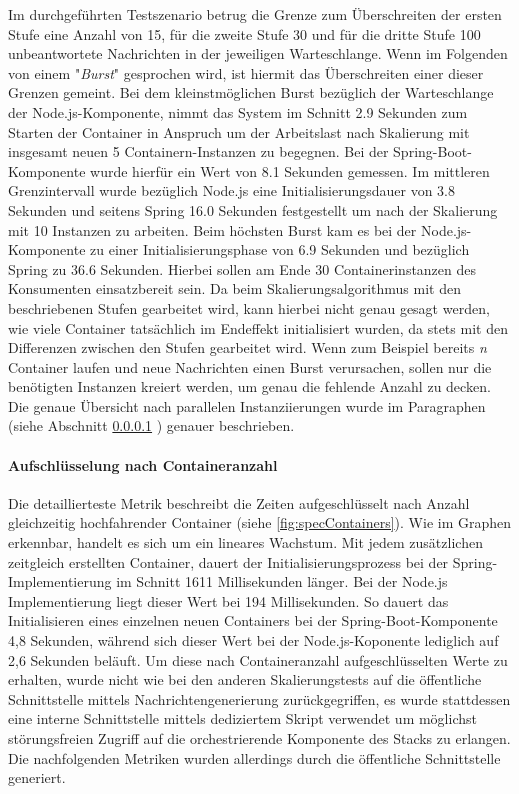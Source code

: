 Im durchgeführten Testszenario betrug die Grenze zum Überschreiten der ersten Stufe eine Anzahl von 15, für die zweite Stufe 30 und für die dritte Stufe 100 unbeantwortete Nachrichten in der jeweiligen Warteschlange. Wenn im Folgenden von einem "\emph{Burst}" gesprochen wird, ist hiermit das Überschreiten einer dieser Grenzen gemeint. Bei dem kleinstmöglichen Burst bezüglich der Warteschlange der Node.js-Komponente, nimmt das System im Schnitt 2.9 Sekunden zum Starten der Container in Anspruch um der Arbeitslast nach Skalierung mit insgesamt neuen 5 Containern-Instanzen zu begegnen. Bei der Spring-Boot-Komponente wurde hierfür ein Wert von 8.1 Sekunden gemessen. Im mittleren Grenzintervall wurde bezüglich Node.js eine Initialisierungsdauer von 3.8 Sekunden und seitens Spring 16.0 Sekunden festgestellt um nach der Skalierung mit 10 Instanzen zu arbeiten. Beim höchsten Burst kam es bei der Node.js-Komponente zu einer Initialisierungsphase von 6.9 Sekunden und bezüglich Spring zu 36.6 Sekunden. Hierbei sollen am Ende 30 Containerinstanzen des Konsumenten einsatzbereit sein. Da beim Skalierungsalgorithmus mit den beschriebenen Stufen gearbeitet wird, kann hierbei nicht genau gesagt werden, wie viele Container tatsächlich im Endeffekt initialisiert wurden, da stets mit den Differenzen zwischen den Stufen gearbeitet wird. Wenn zum Beispiel bereits \emph{n} Container laufen und neue Nachrichten einen Burst verursachen, sollen nur die benötigten Instanzen kreiert werden, um genau die fehlende Anzahl zu decken. Die genaue Übersicht nach parallelen Instanziierungen wurde im Paragraphen (siehe Abschnitt \ref{par:specContainer} ) genauer beschrieben.


\paragraph{Aufschlüsselung nach Containeranzahl}
\label{par:specContainer}
Die detaillierteste Metrik beschreibt die Zeiten aufgeschlüsselt nach Anzahl gleichzeitig hochfahrender Container (siehe \ref{fig:specContainers}). Wie im Graphen erkennbar, handelt es sich um ein lineares Wachstum. Mit jedem zusätzlichen zeitgleich erstellten Container, dauert der Initialisierungsprozess bei der Spring-Implementierung im Schnitt 1611 Millisekunden länger. Bei der Node.js Implementierung liegt dieser Wert bei 194 Millisekunden. So dauert das Initialisieren eines einzelnen neuen Containers bei der Spring-Boot-Komponente 4,8 Sekunden, während sich dieser Wert bei der Node.js-Koponente lediglich auf 2,6 Sekunden beläuft. Um diese nach Containeranzahl aufgeschlüsselten Werte zu erhalten, wurde nicht wie bei den anderen Skalierungstests auf die öffentliche Schnittstelle mittels Nachrichtengenerierung zurückgegriffen, es wurde stattdessen eine interne Schnittstelle mittels dediziertem Skript verwendet um möglichst störungsfreien Zugriff auf die orchestrierende Komponente des Stacks zu erlangen. Die nachfolgenden Metriken wurden allerdings durch die öffentliche Schnittstelle generiert.

